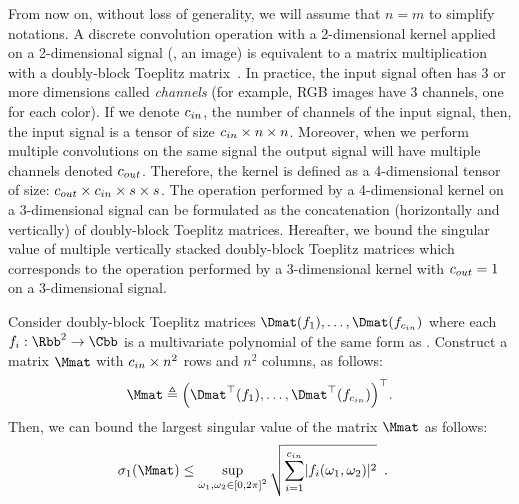 From now on, without loss of generality, we will assume that $n=m$ to simplify notations.
A discrete convolution operation with a 2-dimensional kernel applied on a 2-dimensional signal (\eg, an image) is equivalent to a matrix multiplication with a doubly-block Toeplitz matrix~\cite{jain1989fundamentals}.
In practice, the input signal often has 3 or more dimensions called \emph{channels} (for example, RGB images have 3 channels, one for each color).
If we denote $c_{in}$, the number of channels of the input signal, then, the input signal is a tensor of size $c_{in} \times n \times n$.
Moreover, when we perform multiple convolutions on the same signal the output signal will have multiple channels denoted $c_{out}$. 
Therefore, the kernel is defined as a 4-dimensional tensor of size: $c_{out} \times c_{in} \times s \times s$. 
The operation performed by a 4-dimensional kernel on a 3-dimensional signal can be formulated as the concatenation (horizontally and vertically) of doubly-block Toeplitz matrices.
Hereafter, we bound the singular value of multiple vertically stacked doubly-block Toeplitz matrices which corresponds to the operation performed by a 3-dimensional kernel with $c_{out} = 1$ on a 3-dimensional signal.





\begin{theorem} \label{theorem:bound_sv_stacked_dbt} 
  Consider doubly-block Toeplitz matrices $\Dmat(f_1), \dots, \Dmat(f_{\cin})$ where each $f_i: \Rbb^2 \rightarrow \Cbb$ is a multivariate polynomial of the same form as .
  Construct a matrix $\Mmat$ with $c_{in}\times n^2$ rows and $n^2$ columns, as follows:
  \begin{equation}
    \Mmat \triangleq \leftmat \Dmat^\top(f_1), \dots, \Dmat^\top(f_{\cin}) \rightmat^\top .
  \end{equation}
  Then, we can bound the largest singular value of the matrix $\Mmat$ as follows:
  \begin{align} \label{equation:bound_asymptotic_equiv}
    \sigma_1 \left( \Mmat \right) &\leq \sup_{\omega_1, \omega_2 \in \left[0, 2\pi\right]^2} \sqrt{ \sum_{i=1}^{\cin} \left|f_i\right (\omega_1, \omega_2)|^2} \enspace.
  \end{align}
\end{theorem}

